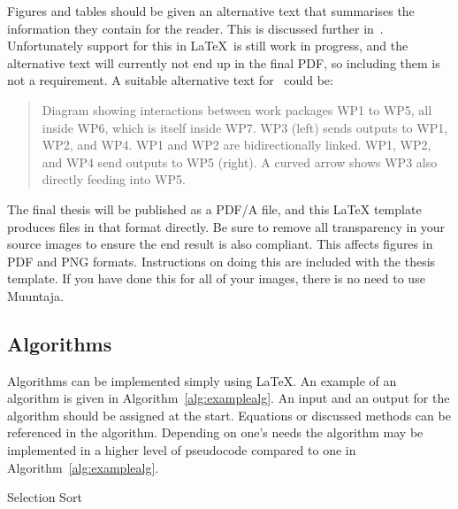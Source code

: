 Figures and tables should be given an alternative text that summarises
the information they contain for the reader. This is discussed further
in~. Unfortunately support for this in
\LaTeX\ is still work in progress, and the alternative text will
currently not end up in the final PDF, so including them is not a requirement.
A suitable alternative text for~ could be:

\begin{quote}
Diagram showing interactions between work packages WP1 to WP5, all
inside WP6, which is itself inside WP7. WP3 (left) sends outputs to
WP1, WP2, and WP4. WP1 and WP2 are bidirectionally linked. WP1,
WP2, and WP4 send outputs to WP5 (right). A curved arrow shows WP3
also directly feeding into WP5.
\end{quote}

The final thesis will be published as a PDF/A file, and this LaTeX
template produces files in that format directly. Be sure to remove all
transparency in your source images to ensure the end result is also
compliant. This affects figures in PDF and PNG formats. Instructions
on doing this are included with the thesis template.  If you have done
this for all of your images, there is no need to use Muuntaja.

\subsection{Algorithms}
Algorithms can be implemented simply using \LaTeX. An example of an
algorithm is given in Algorithm~\ref{alg:examplealg}. An input and an
output for the algorithm should be assigned at the start. Equations
or discussed methods can be referenced in the algorithm. Depending on
one's needs the algorithm may be implemented in a higher level of
pseudocode compared to one in Algorithm~\ref{alg:examplealg}.

\vspace{7mm}
\begin{algorithm}[H]
\SetAlgoLined
\DontPrintSemicolon
{}
\caption{Selection Sort}
\label{alg:examplealg}
\end{algorithm}

